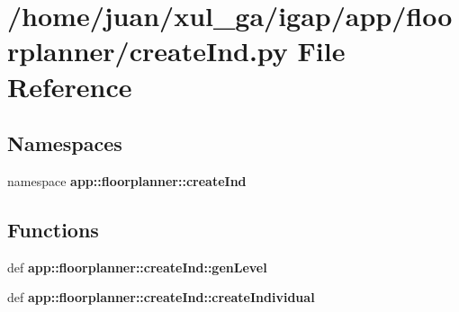 \section{/home/juan/xul\_\-ga/igap/app/floorplanner/createInd.py File Reference}
\label{createInd_8py}
\subsection*{Namespaces}
\begin{CompactItemize}
\item 
namespace {\bf app::floorplanner::createInd}
\end{CompactItemize}
\subsection*{Functions}
\begin{CompactItemize}
\item 
def {\bf app::floorplanner::createInd::genLevel}
\item 
def {\bf app::floorplanner::createInd::createIndividual}
\end{CompactItemize}
